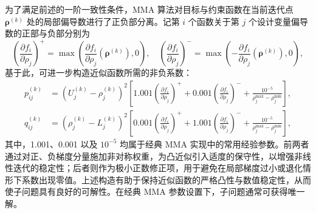 为了满足前述的一阶一致性条件，MMA 算法对目标与约束函数在当前迭代点 $\boldsymbol{\rho}^{(k)}$ 处的局部偏导数进行了正负部分离。记第 $i$ 个函数关于第 $j$ 个设计变量偏导数的正部与负部分别为
\[
\left(\frac{\partial f_i}{\partial \rho_j}\right)^{+} = \max\left(\frac{\partial f_i}{\partial \rho_j}(\boldsymbol{\rho}^{(k)}), 0\right), \quad  \left(\frac{\partial f_i}{\partial \rho_j}\right)^{-} = \max\left(-\frac{\partial f_i}{\partial \rho_j}(\boldsymbol{\rho}^{(k)}), 0\right),
\]
基于此，可进一步构造近似函数所需的非负系数：
\[
\begin{aligned} 
	p_{ij}^{(k)} &= (U_j^{(k)}-\rho_j^{(k)})^2 \left[ 1.001\left(\frac{\partial f_i}{\partial \rho_j}\right)^{+} + 0.001\left(\frac{\partial f_i}{\partial \rho_j}\right)^{-} + \frac{10^{-5}}{\rho_j^{\max}-\rho_j^{\min}} \right],\\ 
	q_{ij}^{(k)} &= (\rho_j^{(k)}-L_j^{(k)})^2 \left[ 0.001\left(\frac{\partial f_i}{\partial \rho_j}\right)^{+} + 1.001\left(\frac{\partial f_i}{\partial \rho_j}\right)^{-} + \frac{10^{-5}}{\rho_j^{\max}-\rho_j^{\min}} \right], 
\end{aligned}
\]
其中，1.001、0.001 以及 $10^{-5}$ 均属于经典 MMA 实现中的常用经验参数。前两者通过对正、负梯度分量施加非对称权重，为凸近似引入适度的保守性，以增强非线性迭代的稳定性；后者则作为极小正数修正项，用于避免在局部梯度过小或退化情形下系数出现零值。上述构造有助于保持近似函数的严格凸性与数值稳定性，从而使子问题具有良好的可解性。在经典 MMA 参数设置下，子问题通常可获得唯一解。

